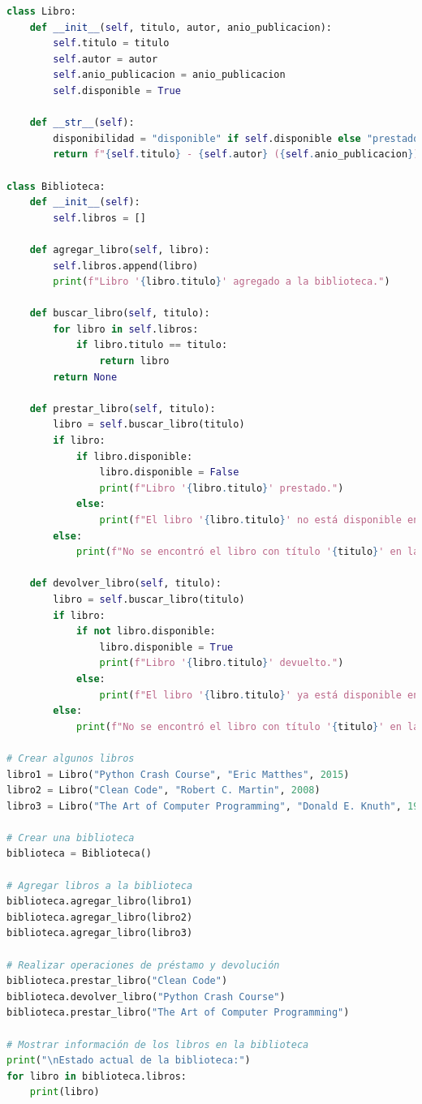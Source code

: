 \documentclass[11pt,a4paper]{article}
\begin{document}
\begin{lstlisting}[language=Python, style=mystyle, caption={Código base sin modificaciones.}]
class Libro:
    def __init__(self, titulo, autor, anio_publicacion):
        self.titulo = titulo
        self.autor = autor
        self.anio_publicacion = anio_publicacion
        self.disponible = True

    def __str__(self):
        disponibilidad = "disponible" if self.disponible else "prestado"
        return f"{self.titulo} - {self.autor} ({self.anio_publicacion}), {disponibilidad}"

class Biblioteca:
    def __init__(self):
        self.libros = []

    def agregar_libro(self, libro):
        self.libros.append(libro)
        print(f"Libro '{libro.titulo}' agregado a la biblioteca.")

    def buscar_libro(self, titulo):
        for libro in self.libros:
            if libro.titulo == titulo:
                return libro
        return None

    def prestar_libro(self, titulo):
        libro = self.buscar_libro(titulo)
        if libro:
            if libro.disponible:
                libro.disponible = False
                print(f"Libro '{libro.titulo}' prestado.")
            else:
                print(f"El libro '{libro.titulo}' no está disponible en este momento.")
        else:
            print(f"No se encontró el libro con título '{titulo}' en la biblioteca.")

    def devolver_libro(self, titulo):
        libro = self.buscar_libro(titulo)
        if libro:
            if not libro.disponible:
                libro.disponible = True
                print(f"Libro '{libro.titulo}' devuelto.")
            else:
                print(f"El libro '{libro.titulo}' ya está disponible en la biblioteca.")
        else:
            print(f"No se encontró el libro con título '{titulo}' en la biblioteca.")

# Crear algunos libros
libro1 = Libro("Python Crash Course", "Eric Matthes", 2015)
libro2 = Libro("Clean Code", "Robert C. Martin", 2008)
libro3 = Libro("The Art of Computer Programming", "Donald E. Knuth", 1968)

# Crear una biblioteca
biblioteca = Biblioteca()

# Agregar libros a la biblioteca
biblioteca.agregar_libro(libro1)
biblioteca.agregar_libro(libro2)
biblioteca.agregar_libro(libro3)

# Realizar operaciones de préstamo y devolución
biblioteca.prestar_libro("Clean Code")
biblioteca.devolver_libro("Python Crash Course")
biblioteca.prestar_libro("The Art of Computer Programming")

# Mostrar información de los libros en la biblioteca
print("\nEstado actual de la biblioteca:")
for libro in biblioteca.libros:
    print(libro)

\end{lstlisting}
\end{document}

